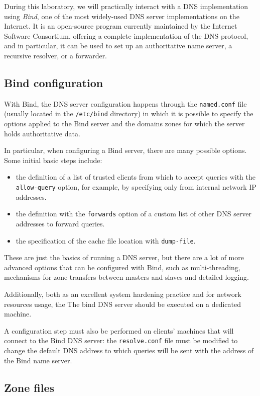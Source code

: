 \documentclass[11pt,a4paper]{article}
\begin{document}
During this laboratory, we will practically interact with a DNS implementation using \textit{Bind}, one of the most widely-used DNS server implementations on the Internet. It is an open-source program currently
maintained by the Internet Software Consortium, offering a complete
implementation of the DNS protocol, and in particular, it can be used to set up an authoritative
name server, a recursive resolver, or a forwarder.

\subsection{Bind configuration}

With Bind, the DNS server configuration happens through the \texttt{named.conf} file (usually located
in the \texttt{/etc/bind} directory) in which it is possible to specify the options applied to the Bind server and
the domains zones for which the server holds authoritative data.

\noindent
In particular, when configuring a Bind server, there are many possible options. Some initial
basic steps include:
\begin{itemize}
\item the definition of a list of trusted clients from which to accept queries with the \texttt{allow-query}
option, for example, by specifying only from internal network IP addresses.
\item the definition with the \texttt{forwards} option of a custom list of other DNS server addresses to
forward queries.
\item the specification of the cache file location with \texttt{dump-file}. 
\end{itemize}
These are just the basics of running a DNS server, but there are a lot of more advanced
options that can be configured with Bind, such as multi-threading, mechanisms for zone transfers
between masters and slaves and detailed logging.

\noindent
Additionally, both as an excellent system hardening practice and for network resources usage, the
The bind DNS server should be executed on a dedicated machine.

\noindent
A configuration step must also be performed on clients' machines that will connect to the Bind
DNS server: the \texttt{resolve.conf} file must be modified to change the default DNS address to
which queries will be sent with the address of the Bind name server.

\subsection{Zone files}
\end{document}
